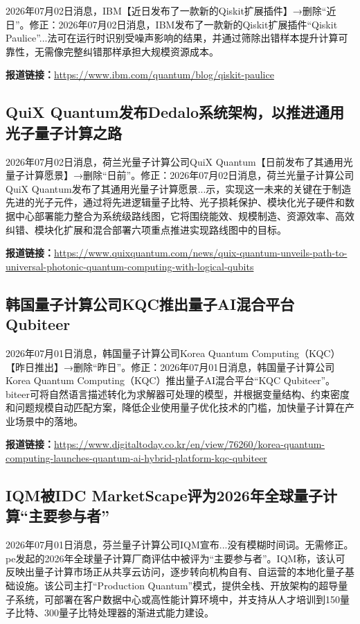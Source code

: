 \documentclass[12pt,a4paper]{ctexart}
\begin{document}
2026年07月02日消息，IBM【近日发布了一款新的Qiskit扩展插件】→删除“近日”。修正：2026年07月02日消息，IBM发布了一款新的Qiskit扩展插件“Qiskit Paulice”...法可在运行时识别受噪声影响的结果，并通过筛除出错样本提升计算可靠性，无需像完整纠错那样承担大规模资源成本。

\noindent\textbf{报道链接：}\url{https://www.ibm.com/quantum/blog/qiskit-paulice}

\subsection{ QuiX Quantum发布Dedalo系统架构，以推进通用光子量子计算之路 }

2026年07月02日消息，荷兰光量子计算公司QuiX Quantum【日前发布了其通用光量子计算愿景】→删除“日前”。修正：2026年07月02日消息，荷兰光量子计算公司QuiX Quantum发布了其通用光量子计算愿景...示，实现这一未来的关键在于制造先进的光子元件，通过将先进逻辑量子比特、光子损耗保护、模块化光子硬件和数据中心部署能力整合为系统级路线图，它将围绕能效、规模制造、资源效率、高效纠错、模块化扩展和混合部署六项重点推进实现路线图中的目标。

\noindent\textbf{报道链接：}\url{https://www.quixquantum.com/news/quix-quantum-unveils-path-to-universal-photonic-quantum-computing-with-logical-qubits}

\subsection{ 韩国量子计算公司KQC推出量子AI混合平台Qubiteer }

2026年07月01日消息，韩国量子计算公司Korea Quantum Computing（KQC）【昨日推出】→删除“昨日”。修正：2026年07月01日消息，韩国量子计算公司Korea Quantum Computing（KQC）推出量子AI混合平台“KQC Qubiteer”。biteer可将自然语言描述转化为求解器可处理的模型，并根据变量结构、约束密度和问题规模自动匹配方案，降低企业使用量子优化技术的门槛，加快量子计算在产业场景中的落地。

\noindent\textbf{报道链接：}\url{https://www.digitaltoday.co.kr/en/view/76260/korea-quantum-computing-launches-quantum-ai-hybrid-platform-kqc-qubiteer}

\subsection{ IQM被IDC MarketScape评为2026年全球量子计算“主要参与者” }

2026年07月01日消息，芬兰量子计算公司IQM宣布...没有模糊时间词。无需修正。pe发起的2026年全球量子计算厂商评估中被评为“主要参与者”。IQM称，该认可反映出量子计算市场正从共享云访问，逐步转向机构自有、自运营的本地化量子基础设施。该公司主打“Production Quantum”模式，提供全栈、开放架构的超导量子系统，可部署在客户数据中心或高性能计算环境中，并支持从人才培训到150量子比特、300量子比特处理器的渐进式能力建设。
\end{document}
